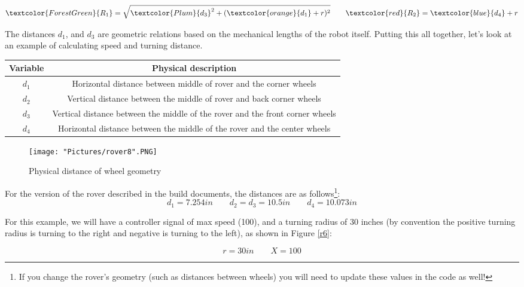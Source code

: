 \documentclass[12pt]{article}
\begin{document}
\begin{equation}
	\textcolor{ForestGreen}{R_1} = \sqrt{\textcolor{Plum}{d_3}^2 + (\textcolor{orange}{d_1} + r)^2}            \qquad \textcolor{red}{R_2} = \textcolor{blue}{d_4} + r
	\label{eq3}
\end{equation}

\noindent The distances $d_1$, and $d_3$ are geometric relations based on the mechanical lengths of the robot itself. Putting this all together, let's look at an example of calculating speed and turning distance. 
\begin{centering}
\begin{tabular}[2]{|c|c|}
	\hline
	\textbf{Variable} & \textbf{Physical description} \\ \hline
	$d_1$ & Horizontal distance between middle of rover and the corner wheels \\ \hline
	$d_2$ & Vertical distance between the middle of rover and back corner wheels \\ \hline
	$d_3$ & Vertical distance between the middle of the rover and the front corner wheels \\ \hline
	$d_4$ & Horizontal distance between the middle of the rover and the center wheels \\ \hline
\end{tabular}

\begin{figure}[H]
 	\centering
	\texttt{[image: "Pictures/rover8".PNG]}
 	\caption{Physical distance of wheel geometry}
	\label{r5}
\end{figure}

\end{centering}
\noindent For the version of the rover described in the build documents, the distances are as follows\footnote{If you change the rover's geometry (such as distances between wheels) you will need to update these values in the code as well!}:
\begin{equation}
	d_1 = 7.254 in \qquad d_2 = d_3 = 10.5 in \qquad d_4 = 10.073 in
\end{equation}

\noindent For this example, we will have a controller signal of max speed (100), and a turning radius of 30 inches (by convention the positive turning radius is turning to the right and negative is turning to the left), as shown in Figure \ref{r6}:

\begin{equation}
	r = 30 in \qquad X = 100 
\end{equation}
\end{document}
